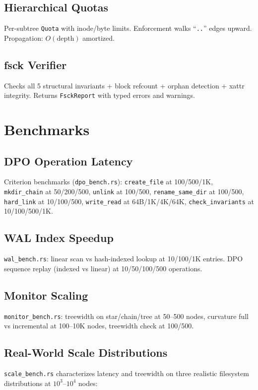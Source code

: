 \documentclass[11pt,a4paper,twoside]{report}
\theoremstyle{definition}
\begin{document}
\section{Hierarchical Quotas}
Per-subtree \texttt{Quota} with inode/byte limits.  Enforcement walks ``\texttt{..}'' edges upward.
Propagation: $O(\text{depth})$ amortized.

\section{fsck Verifier}
Checks all 5 structural invariants + block refcount + orphan detection + xattr integrity.
Returns \texttt{FsckReport} with typed errors and warnings.

\chapter{Benchmarks}

\section{DPO Operation Latency}
Criterion benchmarks (\texttt{dpo\_bench.rs}): \texttt{create\_file} at 100/500/1K,
\texttt{mkdir\_chain} at 50/200/500, \texttt{unlink} at 100/500,
\texttt{rename\_same\_dir} at 100/500, \texttt{hard\_link} at 10/100/500,
\texttt{write\_read} at 64B/1K/4K/64K, \texttt{check\_invariants} at 10/100/500/1K.

\section{WAL Index Speedup}
\texttt{wal\_bench.rs}: linear scan vs hash-indexed lookup at 10/100/1K entries.
DPO sequence replay (indexed vs linear) at 10/50/100/500 operations.

\section{Monitor Scaling}
\texttt{monitor\_bench.rs}: treewidth on star/chain/tree at 50--500 nodes,
curvature full vs incremental at 100--10K nodes, treewidth check at 100/500.

\section{Real-World Scale Distributions}
\texttt{scale\_bench.rs} characterizes latency and treewidth on three
realistic filesystem distributions at $10^3$--$10^4$ nodes:
\end{document}
